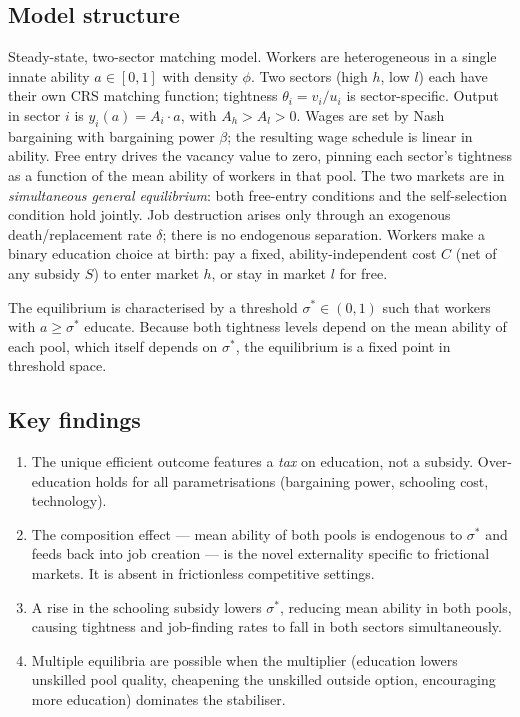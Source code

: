 \documentclass[12pt]{article}
\begin{document}
\subsection*{Model structure}

Steady-state, two-sector matching model. Workers are heterogeneous in a single innate ability $a \in [0,1]$ with density $\phi$. Two sectors (high $h$, low $l$) each have their own CRS matching function; tightness $\theta_i = v_i/u_i$ is sector-specific. Output in sector $i$ is $y_i(a) = A_i \cdot a$, with $A_h > A_l > 0$. Wages are set by Nash bargaining with bargaining power $\beta$; the resulting wage schedule is linear in ability. Free entry drives the vacancy value to zero, pinning each sector's tightness as a function of the mean ability of workers in that pool. The two markets are in \emph{simultaneous general equilibrium}: both free-entry conditions and the self-selection condition hold jointly. Job destruction arises only through an exogenous death/replacement rate $\delta$; there is no endogenous separation. Workers make a binary education choice at birth: pay a fixed, ability-independent cost $C$ (net of any subsidy $S$) to enter market $h$, or stay in market $l$ for free.

The equilibrium is characterised by a threshold $\sigma^* \in (0,1)$ such that workers with $a \geq \sigma^*$ educate. Because both tightness levels depend on the mean ability of each pool, which itself depends on $\sigma^*$, the equilibrium is a fixed point in threshold space.

\subsection*{Key findings}

\begin{enumerate}
    \item The unique efficient outcome features a \emph{tax} on education, not a subsidy. Over-education holds for all parametrisations (bargaining power, schooling cost, technology).
    \item The composition effect --- mean ability of both pools is endogenous to $\sigma^*$ and feeds back into job creation --- is the novel externality specific to frictional markets. It is absent in frictionless competitive settings.
    \item A rise in the schooling subsidy lowers $\sigma^*$, reducing mean ability in both pools, causing tightness and job-finding rates to fall in both sectors simultaneously.
    \item Multiple equilibria are possible when the multiplier (education lowers unskilled pool quality, cheapening the unskilled outside option, encouraging more education) dominates the stabiliser.
\end{enumerate}
\end{document}
